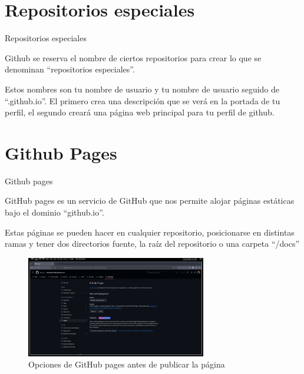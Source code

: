 \documentclass{beamer}
\begin{document}
\section{Repositorios especiales}
\begin{frame}{Repositorios especiales}

    Github se reserva el nombre de ciertos repositorios para crear lo que se denominan ``repositorios especiales''.

    Estos nombres son tu nombre de usuario y tu nombre de usuario seguido de ``.github.io''. El primero crea una descripción que se verá en la portada de tu perfil, el segundo creará una página web principal para tu perfil de github.

\end{frame}
\section{Github Pages}
\begin{frame}{Github pages}

    GitHub pages es un servicio de GitHub que nos permite alojar páginas estáticas bajo el dominio ``github.io''.

    Estas páginas se pueden hacer en cualquier repositorio, posicionarse en distintas ramas y tener dos directorios fuente, la raíz del repositorio o una carpeta ``/docs''

\end{frame}
\begin{frame}

    \begin{figure}[H]
        \centering
        \includegraphics[width=0.7\textwidth]{../Images/github_pages.png}
        \caption{Opciones de GitHub pages antes de publicar la página}
    \end{figure}

\end{frame}
\end{document}
